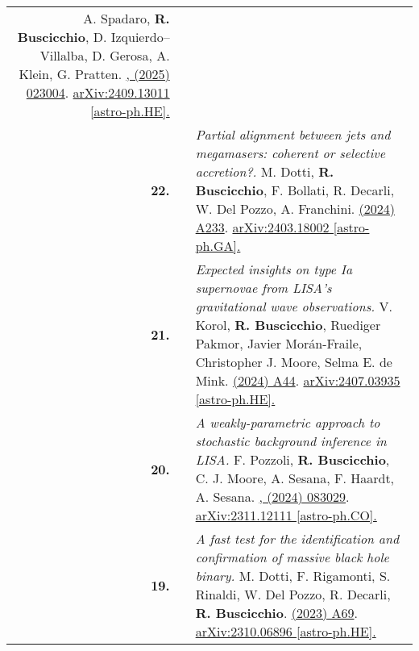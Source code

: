 {\begin{longtable}{rp{0.3cm}p{15.8cm}}
\newline{}
A. Spadaro, \textbf{R. Buscicchio}, D. Izquierdo--Villalba, D. Gerosa, A. Klein, G. Pratten.
\newline{}
\href{https://doi.org/10.1103/PhysRevD.111.023004}{\prd 111, (2025) 023004}. \href{https://arxiv.org/abs/2409.13011}{arXiv:2409.13011 [astro-ph.HE].}
\vspace{0.09cm}\\
%
\textbf{22.} & & \textit{Partial alignment between jets and megamasers: coherent or selective accretion?.}
\newline{}
M. Dotti, \textbf{R. Buscicchio}, F. Bollati, R. Decarli, W. Del Pozzo, A. Franchini.
\newline{}
\href{https://doi.org/10.1051/0004-6361/202450112}{\aap 692 (2024) A233}. \href{https://arxiv.org/abs/2403.18002}{arXiv:2403.18002 [astro-ph.GA].}
\vspace{0.09cm}\\
%
\textbf{21.} & & \textit{Expected insights on type Ia supernovae from LISA's gravitational wave observations.}
\newline{}
V. Korol, \textbf{R. Buscicchio}, Ruediger Pakmor, Javier Morán-Fraile, Christopher J. Moore, Selma E. de Mink.
\newline{}
\href{https://www.aanda.org/articles/aa/full_html/2024/11/aa51380-24/aa51380-24.html}{\aap 691 (2024) A44}. \href{https://arxiv.org/abs/2407.03935}{arXiv:2407.03935 [astro-ph.HE].}
\vspace{0.09cm}\\
%
\textbf{20.} & & \textit{A weakly-parametric approach to stochastic background inference in LISA.}
\newline{}
F. Pozzoli, \textbf{R. Buscicchio}, C. J. Moore, A. Sesana, F. Haardt, A. Sesana.
\newline{}
\href{https://journals.aps.org/prd/abstract/10.1103/PhysRevD.109.083029}{\prd 109, (2024) 083029}. \href{https://arxiv.org/abs/2311.12111}{arXiv:2311.12111 [astro-ph.CO].}
\vspace{0.09cm}\\
%
\textbf{19.} & & \textit{A fast test for the identification and confirmation of massive black hole binary.}
\newline{}
M. Dotti, F. Rigamonti, S. Rinaldi, W. Del Pozzo, R. Decarli, \textbf{R. Buscicchio}.
\newline{}
\href{https://www.aanda.org/articles/aa/abs/2023/12/aa46916-23/aa46916-23.html}{\aap 680 (2023) A69}. \href{https://arxiv.org/abs/2310.06896}{arXiv:2310.06896 [astro-ph.HE].}

\end{longtable}}
